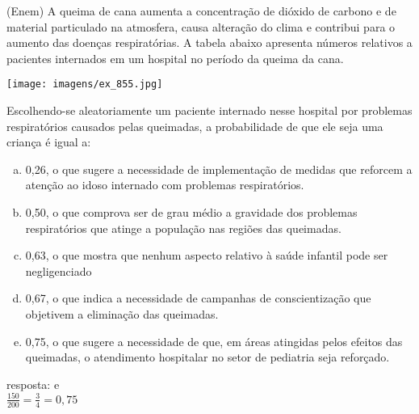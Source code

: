 \begin{ex}
(Enem)  A queima de cana aumenta a concentração de dióxido de carbono e de material particulado na atmosfera, causa alteração do clima e contribui para o aumento das doenças respiratórias. A tabela abaixo apresenta números relativos a pacientes internados em um hospital no período da queima da cana.
   \begin{center}
       \texttt{[image: imagens/ex\_855.jpg]}
   \end{center}
Escolhendo-se aleatoriamente um paciente internado nesse hospital por problemas respiratórios causados pelas queimadas, a probabilidade de que ele seja uma criança é igual a:
   \begin{enumerate}[(a)]
   \item 0,26, o que sugere a necessidade de implementação de medidas que reforcem a atenção ao idoso internado com problemas respiratórios.
   \item 0,50, o que comprova ser de grau médio a gravidade dos problemas respiratórios que atinge a população nas regiões das queimadas.
   \item 0,63, o que mostra que nenhum aspecto relativo à saúde infantil pode ser negligenciado
   \item 0,67, o que indica a necessidade de campanhas de conscientização que objetivem a eliminação das queimadas.
   \item 0,75, o que sugere a necessidade de que, em áreas atingidas pelos efeitos das queimadas, o atendimento hospitalar no setor de pediatria seja reforçado.
   \end{enumerate}
    \begin{sol}
     resposta: e \\
    $\frac{150}{200}=\frac{3}{4}=0,75$
    \end{sol}
\end{ex}